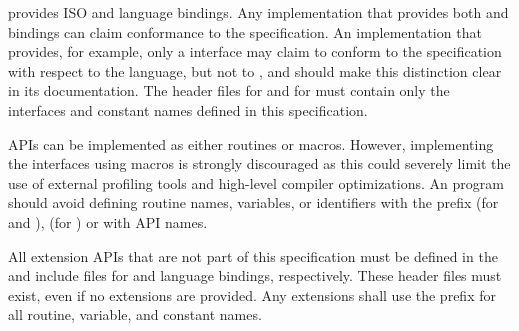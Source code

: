 \openshmem provides ISO \Cstd and \Fortran[90] language bindings.
Any implementation that provides both \Cstd and \Fortran bindings can claim
conformance to the specification. An implementation that provides, for example, only a
\Cstd interface may claim to conform to the \openshmem specification with
respect to the \Cstd language, but not to \Fortran, and should make this distinction
clear in its documentation. The \openshmem header files  for
\Cstd and  for
\Fortran must contain only the interfaces and constant names defined in this
specification.

\openshmem \acp{API} can be implemented as either routines or macros. However,
implementing the interfaces using macros is strongly discouraged as this could
severely limit the use of external profiling tools and high-level compiler
optimizations. An \openshmem program should avoid defining routine names,
variables, or identifiers with the prefix \shmemprefix (for \Cstd and
\Fortran), \shmemprefixC (for \Cstd) or with \openshmem \ac{API} names.

All \openshmem extension \acp{API} that are not part of this specification must
be defined in the  and  include files for
\Cstd and \Fortran language bindings, respectively.  These header files
must exist, even if no extensions are provided.  Any extensions shall use the
 prefix for all routine, variable, and constant names.
